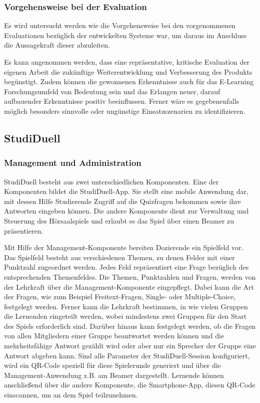 \documentclass[conference]{IEEEtran}
\begin{document}
\subsubsection{Vorgehensweise bei der Evaluation}
Es wird untersucht werden wie die Vorgehensweise bei den vorgenommenen Evaluationen bezüglich der entwickelten Systeme war, um daraus im Anschluss die Aussagekraft dieser abzuleiten.

Es kann angenommen werden, dass eine repräsentative, kritische Evaluation der eigenen Arbeit die zukünftige Weiterentwicklung und Verbesserung des Produkts begünstigt. Zudem können die gewonnenen Erkenntnisse auch für das E-Learning Forschungsumfeld von Bedeutung sein und das Erlangen neuer, darauf aufbauender Erkenntnisse positiv beeinflussen. Ferner wäre es gegebenenfalls möglich besonders sinnvolle oder ungünstige Einsatzszenarien zu identifizieren. 

\subsection{StudiDuell}
\subsubsection{Management und Administration}
StudiDuell besteht aus zwei unterschiedlichen Komponenten. Eine der Komponenten bildet die StudiDuell-App. Sie stellt eine mobile Anwendung dar, mit dessen Hilfe Studierende Zugriff auf die Quizfragen bekommen sowie ihre Antworten eingeben können. Die andere Komponente dient zur Verwaltung und Steuerung des Hörsaalspiels und erlaubt es das Spiel über einen Beamer zu präsentieren. \cite[S. 341]{Hobert2017}

Mit Hilfe der Management-Komponente bereiten Dozierende ein Spielfeld vor. Das Spielfeld besteht aus verschiedenen Themen, zu denen Felder mit einer Punktzahl zugeordnet werden. Jedes Feld repräsentiert eine Frage bezüglich des entsprechenden Themenfeldes. Die Themen, Punktzahlen und Fragen, werden von der Lehrkraft über die Management-Komponente eingepflegt. Dabei kann die Art der Fragen, wie zum Beispiel Freitext-Fragen, Single- oder Multiple-Choice, festgelegt werden. Ferner kann die Lehrkraft bestimmen, in wie vielen Gruppen die Lernenden eingeteilt werden, wobei mindestens zwei Gruppen für den Start des Spiels erforderlich sind. Darüber hinaus kann festgelegt werden, ob die Fragen von allen Mitgliedern einer Gruppe beantwortet werden können und die mehrheitsfähige Antwort gezählt wird oder aber nur ein Sprecher der Gruppe eine Antwort abgeben kann. 
Sind alle Parameter der StudiDuell-Session konfiguriert, wird ein QR-Code speziell für diese Spielerunde generiert und über die Management-Anwendung z.B. am Beamer dargestellt. Lernende können anschließend über die andere Komponente, die Smartphone-App, diesen QR-Code einscannen, um an dem Spiel teilzunehmen. \cite[S. 340f]{Hobert2017}
\end{document}
